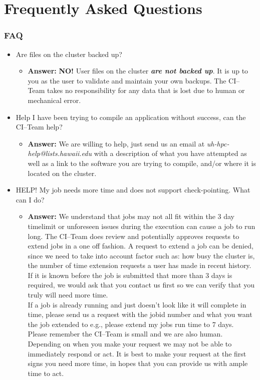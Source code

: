 \documentclass[t,hyperref={pdfpagelabels=false}]{beamer}
\newcommand{\citeam}{CI--Team}
\begin{document}
\section{Frequently Asked Questions}
\begin{frame}
\frametitle{FAQ}
\begin{itemize}\footnotesize
\item Are files on the cluster backed up?
  \begin{itemize}\tiny
  \item \textbf{Answer:} \textbf{NO!}  User files on the cluster \textbf{\emph{are not backed up}}.  It is up to you as the user to validate and maintain your own backups.  The {\citeam} takes no responsibility for any data that is lost due to human or mechanical error.  
  \end{itemize}

\item Help I have been trying to compile an application without success, can the {\citeam} help?
  \begin{itemize}\tiny
  \item \textbf{Answer:} We are willing to help, just send us an email at \textit{uh-hpc-help@lists.hawaii.edu} with a description of what you have attempted as well as a link to the software you are trying to compile, and/or where it is located on the cluster.
  \end{itemize}
  
\item HELP! My job needs more time and does not support check-pointing.  What can I do?
  \begin{itemize}\tiny
  \item \textbf{Answer:} We understand that jobs may not all fit within the 3 day timelimit or unforeseen issues during the execution can cause a job to run long.  The {\citeam} does review and potentially approves requests to extend jobs in a one off fashion.  A request to extend a job can be denied, since we need to take into account factor such as: how busy the cluster is, the number of time extension requests a user has made in recent history.\\If it is known before the job is submitted that more than 3 days is required, we would ask that you contact us first so we can verify that you truly will need more time.\\If a job is already running and just doesn't look like it will complete in time, please send us a request with the jobid number and what you want the job extended to e.g., please extend my jobs run time to 7 days.\\Please remember the {\citeam} is small and we are also human.  Depending on when you make your request we may not be able to immediately respond or act.  It is best to make your request at the first signs you need more time, in hopes that you can provide us with ample time to act.
  \end{itemize}


\end{itemize}

\end{frame}
\end{document}
